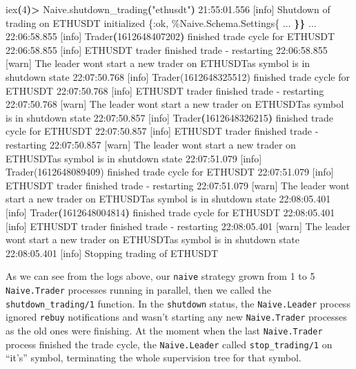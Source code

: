 \documentclass[
]{book}
\newenvironment{Shaded}{\begin{snugshade}}{\end{snugshade}}
\newcommand{\AttributeTok}[1]{\textcolor[rgb]{0.77,0.63,0.00}{#1}}
\newcommand{\ErrorTok}[1]{\textcolor[rgb]{0.64,0.00,0.00}{\textbf{#1}}}
\newcommand{\ExtensionTok}[1]{#1}
\newcommand{\KeywordTok}[1]{\textcolor[rgb]{0.13,0.29,0.53}{\textbf{#1}}}
\newcommand{\NormalTok}[1]{#1}
\newcommand{\OperatorTok}[1]{\textcolor[rgb]{0.81,0.36,0.00}{\textbf{#1}}}
\newcommand{\StringTok}[1]{\textcolor[rgb]{0.31,0.60,0.02}{#1}}
\begin{document}
\begin{Shaded}
\begin{Highlighting}[]
\ExtensionTok{iex}\ErrorTok{(}\ExtensionTok{4}\KeywordTok{)}\OperatorTok{\textgreater{}}\NormalTok{ Naive.shutdown\_trading}\KeywordTok{(}\StringTok{"ethusdt"}\KeywordTok{)}
\ExtensionTok{21:55:01.556}\NormalTok{ [info]  Shutdown of trading on ETHUSDT initialized}
\ExtensionTok{\{:ok,}
 \ExtensionTok{\%Naive.Schema.Settings\{}
     \ExtensionTok{...}
 \ErrorTok{\}\}}
\ExtensionTok{...}
\ExtensionTok{22:06:58.855}\NormalTok{ [info]  Trader}\ErrorTok{(}\ExtensionTok{1612648407202}\KeywordTok{)} \ExtensionTok{finished}\NormalTok{ trade cycle for ETHUSDT}
\ExtensionTok{22:06:58.855}\NormalTok{ [info]  ETHUSDT trader finished trade }\AttributeTok{{-}}\NormalTok{ restarting}
\ExtensionTok{22:06:58.855}\NormalTok{ [warn]  The leader won}\StringTok{\textquotesingle{}t start a new trader on ETHUSDTas symbol is in shutdown state}
\StringTok{22:07:50.768 [info]  Trader(1612648325512) finished trade cycle for ETHUSDT}
\StringTok{22:07:50.768 [info]  ETHUSDT trader finished trade {-} restarting}
\StringTok{22:07:50.768 [warn]  The leader won\textquotesingle{}}\NormalTok{t start a new trader on ETHUSDTas symbol is in shutdown state}
\ExtensionTok{22:07:50.857}\NormalTok{ [info]  Trader}\ErrorTok{(}\ExtensionTok{1612648326215}\KeywordTok{)} \ExtensionTok{finished}\NormalTok{ trade cycle for ETHUSDT}
\ExtensionTok{22:07:50.857}\NormalTok{ [info]  ETHUSDT trader finished trade }\AttributeTok{{-}}\NormalTok{ restarting}
\ExtensionTok{22:07:50.857}\NormalTok{ [warn]  The leader won}\StringTok{\textquotesingle{}t start a new trader on ETHUSDTas symbol is in shutdown state}
\StringTok{22:07:51.079 [info]  Trader(1612648089409) finished trade cycle for ETHUSDT}
\StringTok{22:07:51.079 [info]  ETHUSDT trader finished trade {-} restarting}
\StringTok{22:07:51.079 [warn]  The leader won\textquotesingle{}}\NormalTok{t start a new trader on ETHUSDTas symbol is in shutdown state}
\ExtensionTok{22:08:05.401}\NormalTok{ [info]  Trader}\ErrorTok{(}\ExtensionTok{1612648004814}\KeywordTok{)} \ExtensionTok{finished}\NormalTok{ trade cycle for ETHUSDT}
\ExtensionTok{22:08:05.401}\NormalTok{ [info]  ETHUSDT trader finished trade }\AttributeTok{{-}}\NormalTok{ restarting}
\ExtensionTok{22:08:05.401}\NormalTok{ [warn]  The leader won}\StringTok{\textquotesingle{}t start a new trader on ETHUSDTas symbol is in shutdown state}
\StringTok{22:08:05.401 [info]  Stopping trading of ETHUSDT}
\end{Highlighting}
\end{Shaded}

As we can see from the logs above, our \texttt{naive} strategy grown from 1 to 5 \texttt{Naive.Trader} processes running in parallel, then we called the \texttt{shutdown\_trading/1} function. In the \texttt{shutdown} status, the \texttt{Naive.Leader} process ignored \texttt{rebuy} notifications and wasn't starting any new \texttt{Naive.Trader} processes as the old ones were finishing. At the moment when the last \texttt{Naive.Trader} process finished the trade cycle, the \texttt{Naive.Leader} called \texttt{stop\_trading/1} on ``it's'' symbol, terminating the whole supervision tree for that symbol.
\end{document}
